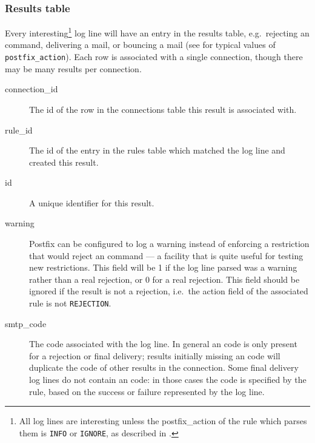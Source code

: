 \subsubsection{Results table}

\label{results table}

Every interesting\footnote{All log lines are interesting unless the
postfix\_action of the rule which parses them is \texttt{INFO} or
\texttt{IGNORE}, as described in .} log line
will have an entry in the results table, e.g.\ rejecting an \SMTP{}
command, delivering a mail, or bouncing a mail (see
 for typical values of
\texttt{postfix\_action}).  Each row is associated with a single
connection, though there may be many results per connection.

\begin{description}

    \item [connection\_id] The id of the row in the connections table this
        result is associated with.

    \item [rule\_id] The id of the entry in the rules table which matched
        the log line and created this result.

    \item [id] A unique identifier for this result.

    \item [warning] Postfix can be configured to log a warning instead of
        enforcing a restriction that would reject an \SMTP{} command --- a
        facility that is quite useful for testing new restrictions.  This
        field will be 1 if the log line parsed was a warning rather than a
        real rejection, or 0 for a real rejection.  This field should be
        ignored if the result is not a rejection, i.e.\ the action field of
        the associated rule is not \texttt{REJECTION}.

    \item [smtp\_code] The \SMTP{} code associated with the log line.  In
        general an \SMTP{} code is only present for a rejection or final
        delivery; results initially missing an \SMTP{} code will duplicate
        the \SMTP{} code of other results in the connection.  Some final
        delivery log lines do not contain an \SMTP{} code: in those cases
        the code is specified by the rule, based on the success or failure
        represented by the log line.


\end{description}
